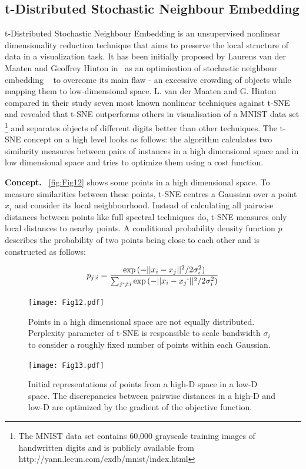 \subsection{t-Distributed Stochastic Neighbour Embedding}
t-Distributed Stochastic Neighbour Embedding is an unsupervised nonlinear dimensionality reduction technique that aims to preserve the local structure of data in a visualization task. It has been initially proposed by Laurens van der Maaten and Geoffrey Hinton in~\cite{maaten2008visualizing} as an optimisation of stochastic neighbour embedding ~\cite{hinton2003stochastic} to overcome its main flaw - an excessive crowding of objects while mapping them to low-dimensional space. L. van der Maaten and G. Hinton compared in their study seven most known nonlinear techniques against t-SNE and revealed that t-SNE outperforms others in visualisation of a MNIST data set \footnote{The MNIST data set contains 60,000 grayscale training images of handwritten digits and is publicly available from http://yann.lecun.com/exdb/mnist/index.html} and separates objects of different digits better than other techniques.
The t-SNE concept on a high level looks as follows: the algorithm calculates two similarity measures between pairs of instances in a high dimensional space and in low dimensional space and tries to optimize them using a cost function.

\textbf{Concept. }~\autoref{fig:Fig12} shows some points in a high dimensional space. To measure similarities between these points, t-SNE centres a Gaussian over a point $x_i$ and consider its local neighbourhood. Instead of calculating all pairwise distances between points like full spectral techniques do, t-SNE measures only local distances to nearby points. A conditional probability density function $p$ describes the probability of two points being close to each other and is constructed as follows:

\begin{equation}
  p_{j|i}=\frac{\exp{(-||x_i-x_j||^2/2\sigma_{i}^2)}}{\sum_{j`\neq i}\exp{(-||x_i-x_j`||^2/2\sigma_{i}^2)}}
    \label{eq:equat8}
\end{equation}

\begin{figure}[H]
    \centering
    \begin{minipage}{0.45\textwidth}
        \centering
        \texttt{[image: Fig12.pdf]}
        \caption{Points in a high dimensional space are not equally distributed. Perplexity parameter of t-SNE is responsible to scale bandwidth $\sigma_i$ to consider a roughly fixed number of points within each Gaussian.}
        \label{fig:Fig12}
    \end{minipage}\hfill
    \begin{minipage}{0.45\textwidth}
        \centering
        \texttt{[image: Fig13.pdf]} 
        \caption{Initial representations of points from a high-D space in a low-D space. The discrepancies between pairwise distances in a high-D and low-D are optimized by the gradient of the objective function.}
        \label{fig:Fig13}
    \end{minipage}
\end{figure}

